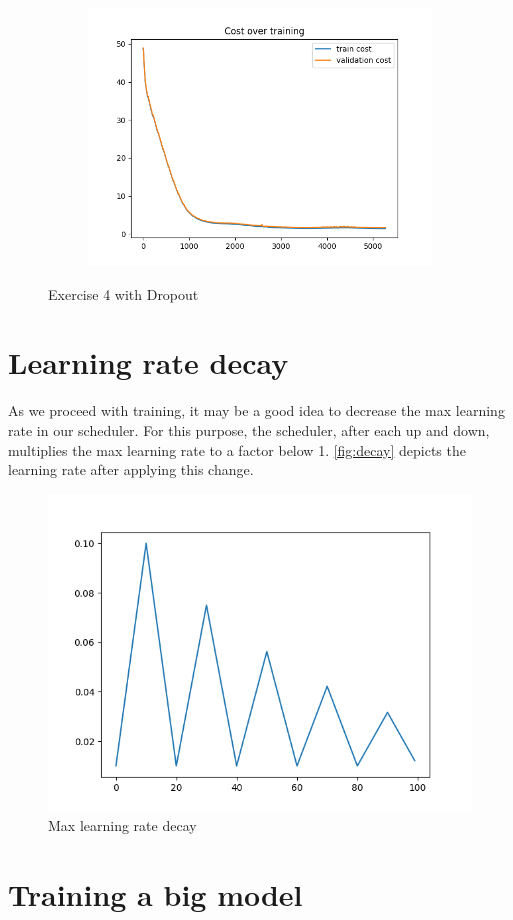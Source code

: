 \documentclass[a4paper]{article}
\begin{document}
\begin{figure}[h]
\begin{subfigure}{0.3\textwidth}
		\includegraphics[width=\linewidth]{images/model_of_ex4_fliping__cost.png}
		\caption{}
	\end{subfigure}
	\caption{Exercise 4 with Dropout}
	\label{fig:aug}
\end{figure}

\section{Learning rate decay}
As we proceed with training, it may be a good idea to decrease the max learning rate in our scheduler. For this purpose, the scheduler, after each up and down, multiplies the max learning rate to a factor below 1. \autoref{fig:decay} depicts the learning rate after applying this change.

\begin{figure}[H]
\centering
\includegraphics[width=0.5\linewidth]{images/scheduler_decay.png}
\caption{Max learning rate decay}
\label{fig:decay}
\end{figure}

\section{Training a big model}
\end{document}
